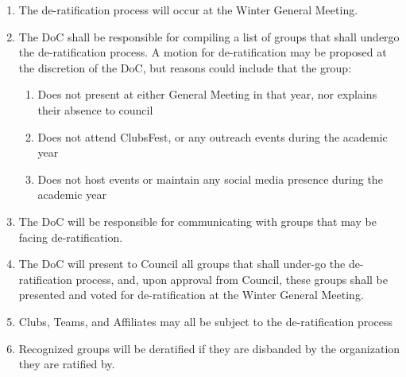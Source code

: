 \begin{enumerate}
 \item
  The de-ratification process will occur at the Winter General Meeting.
 \item
  The DoC shall be responsible for compiling a list of groups that shall undergo the de-ratification process. A motion for de-ratification may be proposed at the discretion of the DoC, but reasons could include that the group:

  \begin{enumerate}
   \item
    Does not present at either General Meeting in that year, nor explains their absence to council
   \item
    Does not attend ClubsFest, or any outreach events during the academic year
   \item
    Does not host events or maintain any social media presence during the academic year
  \end{enumerate}
 \item
  The DoC will be responsible for communicating with groups that may be facing de-ratification.
 \item
  The DoC will present to Council all groups that shall under-go the de-ratification process, and, upon approval from Council, these groups shall be presented and voted for de-ratification at the Winter General Meeting.
 \item
  Clubs, Teams, and Affiliates may all be subject to the de-ratification process
 \item
  Recognized groups will be deratified if they are disbanded by the organization they are ratified by.
\end{enumerate}
% 
